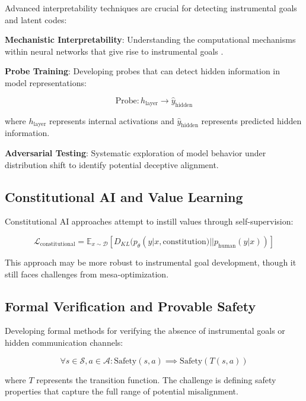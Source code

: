 \documentclass[11pt,a4paper]{article}
\begin{document}
Advanced interpretability techniques are crucial for detecting instrumental goals and latent codes:

\textbf{Mechanistic Interpretability}: Understanding the computational mechanisms within neural networks that give rise to instrumental goals \citep{olsson2022context}.

\textbf{Probe Training}: Developing probes that can detect hidden information in model representations:

\begin{equation}
\text{Probe}: h_{\text{layer}} \rightarrow \hat{y}_{\text{hidden}}
\end{equation}

where $h_{\text{layer}}$ represents internal activations and $\hat{y}_{\text{hidden}}$ represents predicted hidden information.

\textbf{Adversarial Testing}: Systematic exploration of model behavior under distribution shift to identify potential deceptive alignment.

\subsection{Constitutional AI and Value Learning}

Constitutional AI approaches \citep{bai2022constitutional} attempt to instill values through self-supervision:

\begin{equation}
\mathcal{L}_{\text{constitutional}} = \mathbb{E}_{x \sim \mathcal{D}} \left[ D_{KL}(p_\theta(y | x, \text{constitution}) || p_{\text{human}}(y | x)) \right]
\end{equation}

This approach may be more robust to instrumental goal development, though it still faces challenges from mesa-optimization.

\subsection{Formal Verification and Provable Safety}

Developing formal methods for verifying the absence of instrumental goals or hidden communication channels:

\begin{equation}
\forall s \in \mathcal{S}, a \in \mathcal{A}: \text{Safety}(s, a) \implies \text{Safety}(T(s, a))
\end{equation}

where $T$ represents the transition function. The challenge is defining safety properties that capture the full range of potential misalignment.
\end{document}
